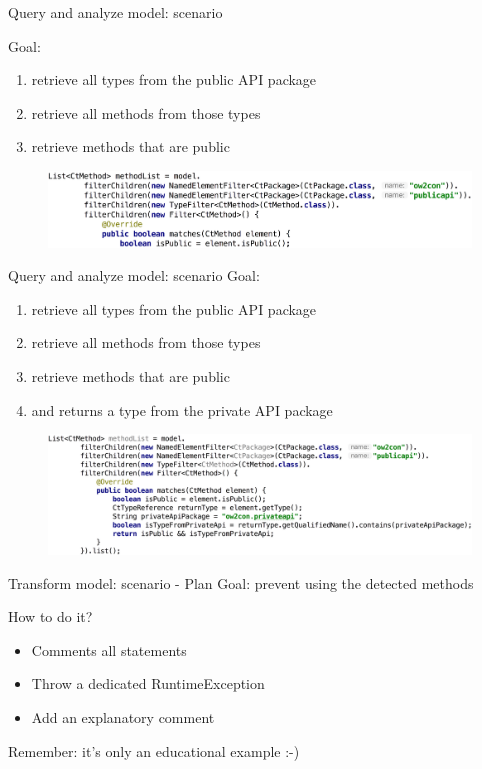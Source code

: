 \documentclass{beamer}
\begin{document}
\begin{frame}[t]{Query and analyze model: scenario}

Goal:
\begin{enumerate}
\item retrieve all types from the public API package
\item retrieve all methods from those types
\item retrieve methods that are public
\end{enumerate}

\begin{figure}
\centering
\includegraphics[width=\textwidth]{figures/queries/query-scenario-3.pdf}
\end{figure}
\end{frame}

\begin{frame}[t]{Query and analyze model: scenario}
Goal:
\begin{enumerate}
\item retrieve all types from the public API package
\item retrieve all methods from those types
\item retrieve methods that are public 
\item and returns a type from the private API package
\end{enumerate}

\begin{figure}
\centering
\includegraphics[width=\textwidth]{figures/queries/query-scenario-4.pdf}
\end{figure}
\end{frame}

\begin{frame}{Transform model: scenario - Plan}
Goal: prevent using the detected methods

How to do it? 
\begin{itemize}
\item Comments all statements
\item Throw a dedicated RuntimeException
\item Add an explanatory comment
\end{itemize}

Remember: it's only an educational example :-)
\end{frame}
\end{document}

